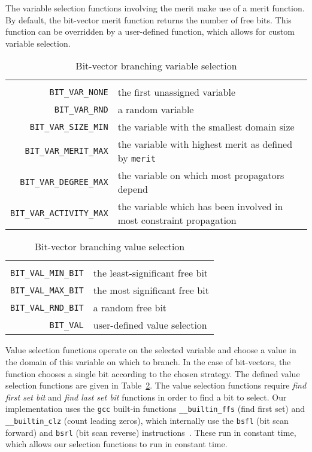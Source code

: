 \documentclass[a4paper,10pt,twoside,openright]{book}
\newcommand{\bh}[1]{\text{\fontfamily{\sfdefault}\selectfont\textbf{#1}}}
\newcommand*\cd[1]{\texttt{#1}}
\begin{document}
The variable selection functions involving the merit
make use of a merit function.
By default,
the bit-vector merit function returns the number of free bits.
This function can be overridden by a user-defined function, 
which allows for custom variable selection.
    \begin{table}[H]
        \small
        \begin{tabularx}{\linewidth}{ r X }
            \bh{variable selection} & \bh{select\ldots} \\
            \cd{BIT_VAR_NONE}	&	the first unassigned variable \\
            \cd{BIT_VAR_RND}	&	a random variable \\
            \cd{BIT_VAR_SIZE_MIN}	&	 the variable with the smallest domain size \\
            \cd{BIT_VAR_MERIT_MAX}	&	the variable with highest merit as defined by \cd{merit} \\
            \cd{BIT_VAR_DEGREE_MAX}	&	the variable on which most propagators depend \\
            \cd{BIT_VAR_ACTIVITY_MAX}	&	the variable which has been involved in most constraint propagation \\
        \end{tabularx}
        \caption{Bit-vector branching variable selection}
        \label{tab:varsel}
    \end{table}
    \begin{table}[H]
        \small
        \begin{tabularx}{\linewidth}{ r X }
            \bh{value selection} & \bh{select\ldots} \\
            \cd{BIT_VAL_MIN_BIT}	&	the least-significant free bit \\
            \cd{BIT_VAL_MAX_BIT}	&	the most significant free bit \\
            \cd{BIT_VAL_RND_BIT}	&	a random free bit \\
            \cd{BIT_VAL}	&	user-defined value selection \\
        \end{tabularx}
        \caption{Bit-vector branching value selection}
        \label{tab:valsel}
    \end{table}

Value selection functions
operate on the selected variable and choose a 
value in the domain of this variable on which to branch.
In the case of bit-vectors, the function chooses a single
bit according to the chosen strategy.
The defined value selection functions are given in Table~\ref{tab:valsel}.
The value selection functions require 
\textit{find first set bit} and \textit{find last set bit} functions in order
to find a bit to select. 
Our implementation uses the 
\cd{gcc} built-in functions
\cd{__builtin_ffs} (find first set) and \cd{__builtin_clz} (count leading zeros),
which internally use the \cd{bsfl} (bit scan forward) and \cd{bsrl} (bit scan reverse)
instructions~\cite{intelffs}.
These run in constant time, which allows our 
selection functions to run in constant time.
\end{document}
